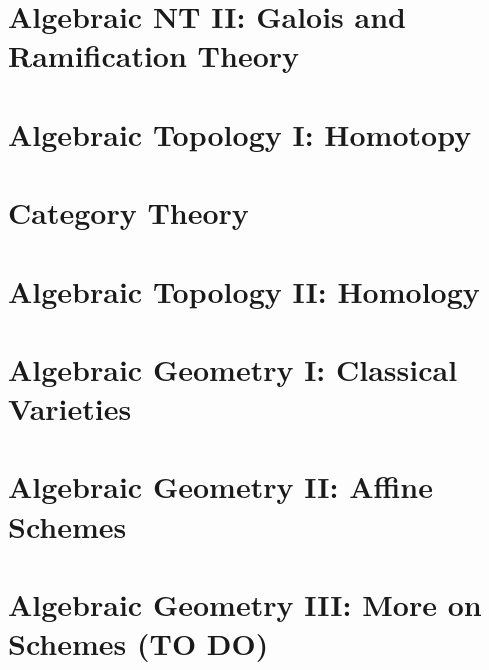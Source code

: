 \documentclass[11pt,twoside=semi,openright,numbers=noenddot]{scrbook}
\begin{document}
\part{Algebraic NT II: Galois and Ramification Theory}
\parttoc





\part{Algebraic Topology I: Homotopy}
\parttoc



\part{Category Theory}
\parttoc



\part{Algebraic Topology II: Homology}
\parttoc





\part{Algebraic Geometry I: Classical Varieties}
\parttoc





\part{Algebraic Geometry II: Affine Schemes}
\parttoc







\part{Algebraic Geometry III: More on Schemes (TO DO)}
\parttoc
\end{document}
